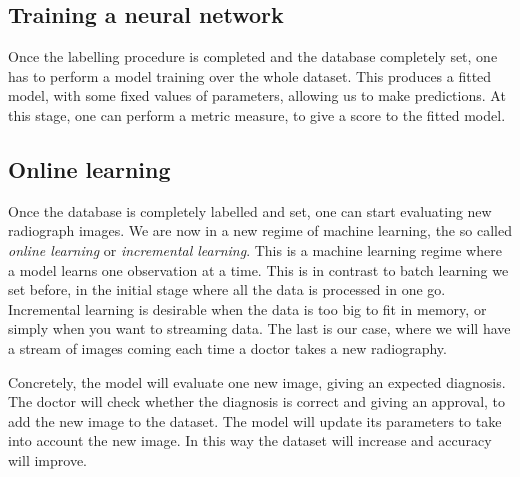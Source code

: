 \documentclass[a4paper, 10pt, superscriptaddress, nofootinbib, showkeys, notitlepage]{revtex4-1}
\begin{document}
\subsection{Training a neural network}
	Once the labelling procedure is completed and the database completely set, one has to perform a model training over the whole dataset.
	This produces a fitted model, with some fixed values of parameters, allowing us to make predictions.
	At this stage, one can perform a metric measure, to give a score to the fitted model.
\subsection{Online learning}
	Once the database is completely labelled and set, one can start evaluating new radiograph images.
	We are now in a new regime of machine learning, the so called \emph{online learning} or \emph{incremental learning}.
	This is a machine learning regime where a model learns one observation at a time.
	This is in contrast to batch learning we set before, in the initial stage where all the data is processed in one go. 
	Incremental learning is desirable when the data is too big to fit in memory, or simply when you want to streaming data.
	The last is our case, where we will have a stream of images coming each time a doctor takes a new radiography.
	
	Concretely, the model will evaluate one new image, giving an expected diagnosis. 
	The doctor will check whether the diagnosis is correct and giving an approval, to add the new image to the dataset.
	The model will update its parameters to take into account the new image.
	In this way the dataset will increase and accuracy will improve.
%	
%	
%	
\end{document}
